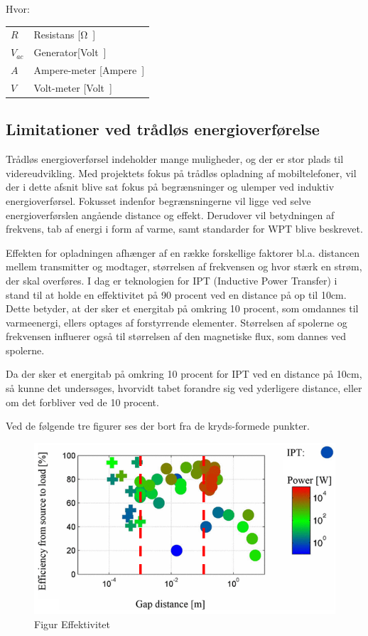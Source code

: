 Hvor:
\begin{table}[H]
	\begin{tabular}{l|l}
	$R$     & Resistans [\si \ohm] \\
	$V_{ac}$ 	   &  Generator[\si Volt] \\
	$A$ 	   & Ampere-meter [\si Ampere] \\
	$V$			& Volt-meter [\si Volt]
	\end{tabular}
\end{table}

\subsection{Limitationer ved trådløs energioverførelse }
Trådløs energioverførsel indeholder mange muligheder, og der er stor plads til videreudvikling. Med projektets fokus på trådløs opladning af mobiltelefoner, vil der i dette afsnit blive sat fokus på begrænsninger og ulemper ved induktiv energioverførsel. Fokusset indenfor begrænsningerne vil ligge ved selve energioverførslen angående distance og effekt. Derudover vil betydningen af frekvens, tab af energi i form af varme, samt standarder for WPT blive beskrevet.

Effekten for opladningen afhænger af en række forskellige faktorer bl.a. distancen mellem transmitter og modtager, størrelsen af frekvensen og hvor stærk en strøm, der skal overføres. I dag er teknologien for IPT (Inductive Power Transfer) i stand til at holde en effektivitet på 90 procent ved en distance på op til 10cm. Dette betyder, at der sker et energitab på omkring 10 procent, som omdannes til varmeenergi, ellers optages af forstyrrende elementer. Størrelsen af spolerne og frekvensen influerer også til størrelsen af den magnetiske flux, som dannes ved spolerne.

Da der sker et energitab på omkring 10 procent for IPT ved en distance på 10cm, så kunne det undersøges, hvorvidt tabet forandre sig ved yderligere distance, eller om det forbliver ved de 10 procent.

Ved de følgende tre figurer ses der bort fra de kryds-formede punkter.

\begin{figure}[H]
\centering
\includegraphics[scale=0.5]{Vildledning/Schematics/Effektivitet_vs_gap.png}
\caption{Figur Effektivitet}
\end{figure}

